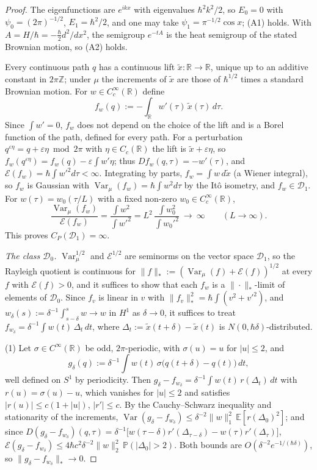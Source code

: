 \documentclass[11pt,a4paper]{article}
\theoremstyle{definition}
\theoremstyle{remark}
\newcommand{\E}{\mathbb{E}}
\newcommand{\R}{\mathbb{R}}
\newcommand{\Var}{\operatorname{Var}}
\newcommand{\cE}{\mathcal{E}}
\newcommand{\cD}{\mathcal{D}}
\begin{document}
\begin{proof}
The eigenfunctions are $e^{ikx}$ with eigenvalues $\hbar^2k^2/2$, so $E_0=0$ with $\psi_0=(2\pi)^{-1/2}$, $E_1=\hbar^2/2$, and one may take $\psi_1=\pi^{-1/2}\cos x$; (A1) holds.
With $A=H/\hbar=-\tfrac{\hbar}{2}d^2/dx^2$, the semigroup $e^{-tA}$ is the heat semigroup of the stated Brownian motion, so (A2) holds.

Every continuous path $q$ has a continuous lift $\tilde x:\R\to\R$, unique up to an additive constant in $2\pi\mathbb Z$; under $\mu$ the increments of $\tilde x$ are those of $\hbar^{1/2}$ times a standard Brownian motion.
For $w\in C_c^\infty(\R)$ define
\[
  f_w(q):=-\int_\R w'(\tau)\,\tilde x(\tau)\,d\tau .
\]
Since $\int w'=0$, $f_w$ does not depend on the choice of the lift and is a Borel function of the path, defined for every path.
For a perturbation $q^{\varepsilon\eta}=q+\varepsilon\eta\bmod2\pi$ with $\eta\in C_c(\R)$ the lift is $\tilde x+\varepsilon\eta$, so $f_w(q^{\varepsilon\eta})=f_w(q)-\varepsilon\int w'\eta$; thus $Df_w(q,\tau)=-w'(\tau)$, and $\cE(f_w)=\hbar\int w'^2d\tau<\infty$.
Integrating by parts, $f_w=\int w\,d\tilde x$ (a Wiener integral), so $f_w$ is Gaussian with $\Var_\mu(f_w)=\hbar\int w^2d\tau$ by the It\^o isometry, and $f_w\in\cD_1$.
For $w(\tau)=w_0(\tau/L)$ with a fixed non-zero $w_0\in C_c^\infty(\R)$,
\[
  \frac{\Var_\mu(f_w)}{\cE(f_w)}=\frac{\int w^2}{\int w'^2}=L^2\,\frac{\int w_0^2}{\int w_0'^2}\ \longrightarrow\ \infty\qquad(L\to\infty).
\]
This proves $C_P(\cD_1)=\infty$.

\emph{The class $\cD_0$.}
$\Var_\mu^{1/2}$ and $\cE^{1/2}$ are seminorms on the vector space $\cD_1$, so the Rayleigh quotient is continuous for $\|f\|_*:=(\Var_\mu(f)+\cE(f))^{1/2}$ at every $f$ with $\cE(f)>0$, and it suffices to show that each $f_w$ is a $\|\cdot\|_*$-limit of elements of $\cD_0$.
Since $f_v$ is linear in $v$ with $\|f_v\|_*^2=\hbar\int(v^2+v'^2)$, and $w_\delta(s):=\delta^{-1}\int_{s-\delta}^sw\to w$ in $H^1$ as $\delta\to0$, it suffices to treat $f_{w_\delta}=\delta^{-1}\int w(t)\,\Delta_t\,dt$, where $\Delta_t:=\tilde x(t+\delta)-\tilde x(t)$ is $N(0,\hbar\delta)$-distributed.

(1) Let $\sigma\in C^\infty(\R)$ be odd, $2\pi$-periodic, with $\sigma(u)=u$ for $|u|\le2$, and
\[
  g_\delta(q):=\delta^{-1}\int w(t)\,\sigma\bigl(q(t+\delta)-q(t)\bigr)\,dt ,
\]
well defined on $S^1$ by periodicity.
Then $g_\delta-f_{w_\delta}=\delta^{-1}\int w(t)\,r(\Delta_t)\,dt$ with $r(u)=\sigma(u)-u$, which vanishes for $|u|\le2$ and satisfies $|r(u)|\le c(1+|u|)$, $|r'|\le c$.
By the Cauchy--Schwarz inequality and stationarity of the increments, $\Var(g_\delta-f_{w_\delta})\le\delta^{-2}\|w\|_1^2\,\E[r(\Delta_0)^2]$; and since $D(g_\delta-f_{w_\delta})(q,\tau)=\delta^{-1}\bigl[w(\tau-\delta)r'(\Delta_{\tau-\delta})-w(\tau)r'(\Delta_\tau)\bigr]$, $\cE(g_\delta-f_{w_\delta})\le4\hbar c^2\delta^{-2}\|w\|_2^2\,\mathbb P(|\Delta_0|>2)$.
Both bounds are $O(\delta^{-2}e^{-1/(\hbar\delta)})$, so $\|g_\delta-f_{w_\delta}\|_*\to0$.


\end{proof}
\end{document}
